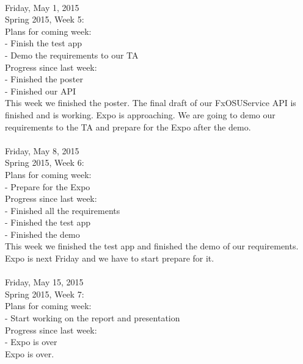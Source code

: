 {\hrulefill \\
Friday, May 1, 2015 \\
Spring 2015, Week 5: \\

Plans for coming week: \\
- Finish the test app \\
- Demo the requirements to our TA \\

Progress since last week: \\
- Finished the poster \\
- Finished our API \\

This week we finished the poster. The final draft of our FxOSUService API is finished and is working. Expo is approaching. We are going to demo our requirements to the TA and prepare for the Expo after the demo. \\

\hrulefill \\
Friday, May 8, 2015 \\
Spring 2015, Week 6: \\

Plans for coming week: \\
- Prepare for the Expo \\

Progress since last week: \\
- Finished all the requirements \\
- Finished the test app \\
- Finished the demo \\

This week we finished the test app and finished the demo of our requirements. Expo is next Friday and we have to start prepare for it. \\

\hrulefill \\
Friday, May 15, 2015 \\
Spring 2015, Week 7: \\

Plans for coming week: \\
- Start working on the report and presentation \\

Progress since last week: \\
- Expo is over \\

Expo is over. \\

\hrulefill \\
}